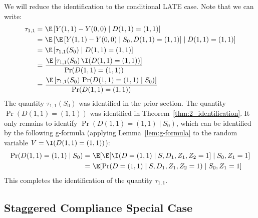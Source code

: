 We will reduce the identification to the conditional LATE case. Note that we can write:
\begin{align}
    \tau_{1,1} =~& \E\left[Y(1,1) - Y(0,0) \mid D(1,1)=(1,1)\right]\\
    =~& \E\left[\E\left[Y(1,1) - Y(0,0)\mid S_0, D(1,1)=(1,1)\right] \mid D(1,1)=(1,1)\right]\\
    =~& \E\left[\tau_{1,1}(S_0) \mid D(1,1)=(1,1)\right]\\
    =~& \frac{\E\left[\tau_{1,1}(S_0)\, \I(D(1,1)=(1,1))\right]}{\Pr(D(1,1)=(1,1))}\\
    =~& \frac{\E\left[\tau_{1,1}(S_0)\, \Pr(D(1,1)=(1,1)\mid S_0)\right]}{\Pr(D(1,1)=(1,1))}
\end{align}
The quantity $\tau_{1,1}(S_0)$ was identified in the prior section. The quantity $\Pr(D(1,1)=(1,1))$ was identified in Theorem~\ref{thm:2_identification}. It only remains to identify $\Pr(D(1,1)=(1,1)\mid S_0)$, which can be identified by the following g-formula (applying Lemma~\ref{lem:g-formula} to the random variable $V=\I(D(1,1)=(1,1))$):
\begin{align*}
    \Pr(D(1,1)=(1,1)\mid S_0)
    =~& \E[\E[\I(D=(1,1)\mid S, D_1, Z_1, Z_2=1] \mid S_0, Z_1=1]\\
    =~& \E[\Pr(D=(1,1)\mid S, D_1, Z_1, Z_2=1) \mid S_0, Z_1=1]\\
\end{align*}
This completes the identification of the quantity $\tau_{1,1}$.

\subsection{Staggered Compliance Special Case}\label{sec:staggered}

